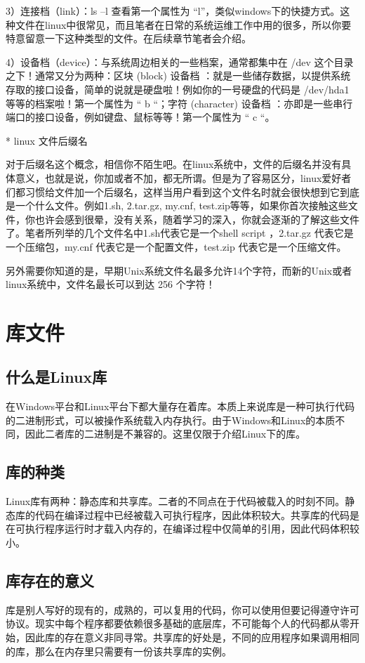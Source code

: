 3）连接档（link）：ls –l 查看第一个属性为 “l”，类似windows下的快捷方式。这种文件在linux中很常见，而且笔者在日常的系统运维工作中用的很多，所以你要特意留意一下这种类型的文件。在后续章节笔者会介绍。

4）设备档（device）：与系统周边相关的一些档案，通常都集中在 /dev 这个目录之下！通常又分为两种：区块 (block) 设备档 ：就是一些储存数据，以提供系统存取的接口设备，简单的说就是硬盘啦！例如你的一号硬盘的代码是 /dev/hda1 等等的档案啦！第一个属性为 “ b “；字符 (character) 设备档 ：亦即是一些串行端口的接口设备，例如键盘、鼠标等等！第一个属性为 “ c “。

* linux 文件后缀名

对于后缀名这个概念，相信你不陌生吧。在linux系统中，文件的后缀名并没有具体意义，也就是说，你加或者不加，都无所谓。但是为了容易区分，linux爱好者们都习惯给文件加一个后缀名，这样当用户看到这个文件名时就会很快想到它到底是一个什么文件。例如1.sh, 2.tar.gz, my.cnf, test.zip等等，如果你首次接触这些文件，你也许会感到很晕，没有关系，随着学习的深入，你就会逐渐的了解这些文件了。笔者所列举的几个文件名中1.sh代表它是一个shell script ，2.tar.gz 代表它是一个压缩包，my.cnf 代表它是一个配置文件，test.zip 代表它是一个压缩文件。

另外需要你知道的是，早期Unix系统文件名最多允许14个字符，而新的Unix或者linux系统中，文件名最长可以到达 256 个字符！


\section{库文件}
\subsection{什么是Linux库}
在Windows平台和Linux平台下都大量存在着库。本质上来说库是一种可执行代码的二进制形式，可以被操作系统载入内存执行。由于Windows和Linux的本质不同，因此二者库的二进制是不兼容的。这里仅限于介绍Linux下的库。  


\subsection{库的种类}
 Linux库有两种：静态库和共享库。二者的不同点在于代码被载入的时刻不同。静态库的代码在编译过程中已经被载入可执行程序，因此体积较大。共享库的代码是在可执行程序运行时才载入内存的，在编译过程中仅简单的引用，因此代码体积较小。   


\subsection{库存在的意义}
  库是别人写好的现有的，成熟的，可以复用的代码，你可以使用但要记得遵守许可协议。现实中每个程序都要依赖很多基础的底层库，不可能每个人的代码都从零开始，因此库的存在意义非同寻常。共享库的好处是，不同的应用程序如果调用相同的库，那么在内存里只需要有一份该共享库的实例。  


